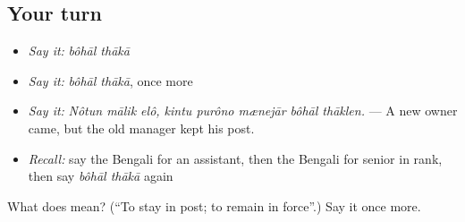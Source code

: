 \subsection*{Your turn}
\begin{itemize}
\raggedright
  \item \emph{Say it:} \emph{bôhāl thākā}
  \item \emph{Say it:} \emph{bôhāl thākā}, once more
  \item \emph{Say it:} \emph{Nôtun mālik elô, kintu purôno mænejār bôhāl thāklen.} — A new owner came, but the old manager kept his post.
  \item \emph{Recall:} say the Bengali for an assistant, then the Bengali for senior in rank, then say \emph{bôhāl thākā} again
\end{itemize}

\begin{tcolorbox}[breakable,colback=teal!4,colframe=teal!35!black,title={Before you move on}]
What does   mean? (\textquotedblleft{}To stay in post; to remain in force\textquotedblright{}.) Say it once more.
\end{tcolorbox}
